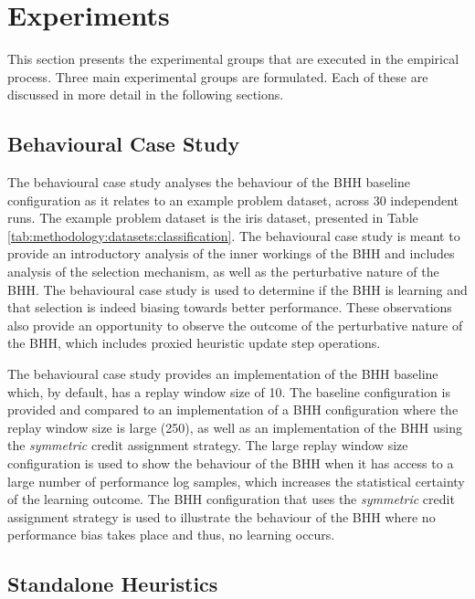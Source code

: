 \section{Experiments}
\label{sec:methodology:experiments}

This section presents the experimental groups that are executed in the empirical process. Three main experimental groups are formulated. Each of these are discussed in more detail in the following sections.


\subsection{Behavioural Case Study}
\label{sec:methodology:experiments:case_study}

The behavioural case study analyses the behaviour of the \acs{BHH} baseline configuration as it relates to an example problem dataset, across 30 independent runs. The example problem dataset is the iris dataset, presented in Table \ref{tab:methodology:datasets:classification}. The behavioural case study is meant to provide an introductory analysis of the inner workings of the \acs{BHH} and includes analysis of the selection mechanism, as well as the perturbative nature of the \acs{BHH}. The behavioural case study is used to determine if the \acs{BHH} is learning and that selection is indeed biasing towards better performance. These observations also provide an opportunity to observe the outcome of the perturbative nature of the \acs{BHH}, which includes proxied heuristic update step operations.

The behavioural case study provides an implementation of the \acs{BHH} baseline which, by default, has a replay window size of 10. The baseline configuration is provided and compared to an implementation of a \acs{BHH} configuration where the replay window size is large (250), as well as an implementation of the \acs{BHH} using the \textit{symmetric} credit assignment strategy. The large replay window size configuration is used to show the behaviour of the \acs{BHH} when it has access to a large number of performance log samples, which increases the statistical certainty of the learning outcome. The \acs{BHH} configuration that uses the \textit{symmetric} credit assignment strategy is used to illustrate the behaviour of the \acs{BHH} where no performance bias takes place and thus, no learning occurs.

\subsection{Standalone Heuristics}
\label{sec:methodology:experiments:standalone_optimisers}

